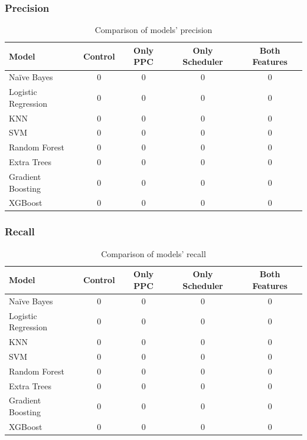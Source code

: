 \subsubsection{Precision}

\begin{table}[h!]
    \centering
    \begin{tabular}{lcccc}
        \toprule
        \textbf{Model} & \textbf{Control} & \textbf{Only PPC} & \textbf{Only Scheduler} & \textbf{Both Features} \\
        \midrule
        Naïve Bayes        & 0 & 0 & 0 & 0 \\
        Logistic Regression & 0 & 0 & 0 & 0 \\
        KNN                 & 0 & 0 & 0 & 0 \\
        SVM                 & 0 & 0 & 0 & 0 \\
        Random Forest       & 0 & 0 & 0 & 0 \\
        Extra Trees         & 0 & 0 & 0 & 0 \\
        Gradient Boosting   & 0 & 0 & 0 & 0 \\
        XGBoost             & 0 & 0 & 0 & 0 \\
        \bottomrule
    \end{tabular}
    \caption{Comparison of models' precision}\label{tab:models_precision_comparison}
\end{table}

\subsubsection{Recall}

\begin{table}[h!]
    \centering
    \begin{tabular}{lcccc}
        \toprule
        \textbf{Model} & \textbf{Control} & \textbf{Only PPC} & \textbf{Only Scheduler} & \textbf{Both Features} \\
        \midrule
        Naïve Bayes        & 0 & 0 & 0 & 0 \\
        Logistic Regression & 0 & 0 & 0 & 0 \\
        KNN                 & 0 & 0 & 0 & 0 \\
        SVM                 & 0 & 0 & 0 & 0 \\
        Random Forest       & 0 & 0 & 0 & 0 \\
        Extra Trees         & 0 & 0 & 0 & 0 \\
        Gradient Boosting   & 0 & 0 & 0 & 0 \\
        XGBoost             & 0 & 0 & 0 & 0 \\
        \bottomrule
    \end{tabular}
    \caption{Comparison of models' recall}\label{tab:models_recall_comparison}
\end{table}

